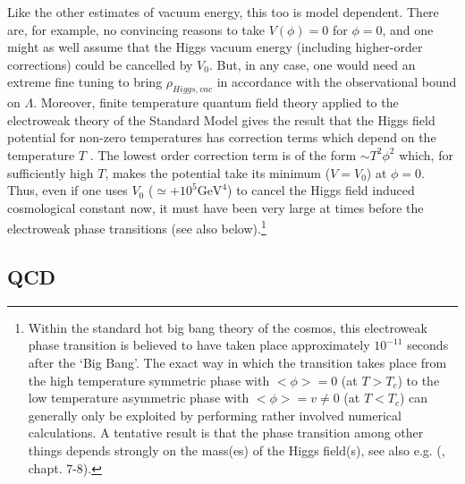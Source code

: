 \documentclass[12pt]{article}
\def\ss{\subsection}
\begin{document}
Like the other estimates of vacuum energy, this too is model
dependent. There are, for example, no convincing reasons to take
$V(\phi)=0$ for $\phi =0$, and one might as well assume that the
Higgs vacuum energy (including higher-order corrections) could be
cancelled by $V_0$. But, in any case, one would need an extreme
fine tuning to bring $\rho _{Higgs,vac}$ in accordance with the
observational bound on $\Lambda$. Moreover, finite temperature
quantum field theory applied to the electroweak theory of the
Standard Model gives the result that the Higgs field potential for
non-zero temperatures has correction terms which depend on the
temperature $T$ \cite{kolb93}. The lowest order correction term is
of the form $\sim T^2\phi ^2$ which, for sufficiently high $T$,
makes the potential take its minimum ($V=V_0$) at $\phi =0$. Thus,
even if one uses $V_0$ ($\simeq + 10^5 \mbox{GeV}^4$) to cancel
the Higgs field induced cosmological constant now, it must have
been very large at times before the electroweak phase transitions
(see also below).\footnote{Within the standard hot big bang theory
of the cosmos, this electroweak phase transition is believed to
have taken place approximately $10^{-11}$ seconds after the `Big
Bang'. The exact way in which the transition takes place from the high
temperature symmetric phase with $<\phi> = 0$ (at $T>T_c$) to the
low temperature asymmetric phase with $<\phi> = v \neq 0$ (at
$T<T_c$) can generally only be exploited by performing
rather involved numerical calculations. A tentative result is that
the phase transition among other things depends strongly on the
mass(es) of the Higgs field(s), see also e.g. (\cite{kolb93},
chapt. 7-8).} 

\ss{QCD}
\end{document}
